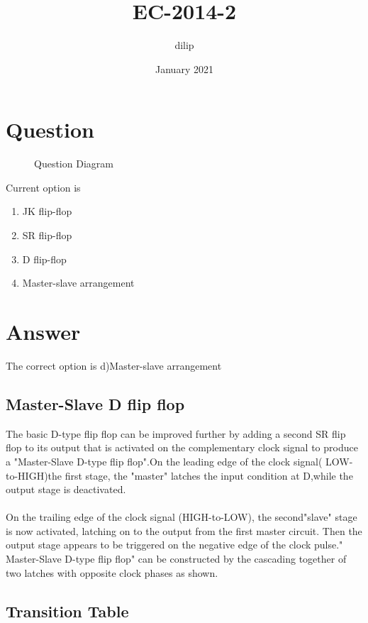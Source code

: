 \documentclass{article}
\title{EC-2014-2}
\author{dilip}
\date{January 2021}
\begin{document}
\maketitle

\section{Question}

\begin{figure}[h]
    \centering
    \scalebox{0.65}{
    }
    \caption{Question Diagram}
    \label{fig:my_label}
\end{figure}

Current option is

\begin{enumerate}[label=(\alph*)]
    \item JK flip-flop
    \item SR flip-flop
    \item D flip-flop
    \item Master-slave arrangement
\end{enumerate}

\section{Answer} 
 The correct option is d)Master-slave arrangement
 \subsection{Master-Slave D flip flop}
  The basic D-type flip flop can be improved further by adding a second SR flip flop to its output that is activated on the complementary clock signal to produce a "Master-Slave D-type flip flop".On the leading edge of the clock signal( LOW-to-HIGH)the first stage, the "master" latches the input condition at D,while the output stage is deactivated.
  \paragraph{}
  On the trailing edge of the clock signal (HIGH-to-LOW), the second"slave" stage is now activated, latching on to the output from the first master circuit. Then the output stage appears to be triggered on the negative edge of the clock pulse." Master-Slave D-type flip flop" can be constructed by the cascading together of two latches with opposite clock phases as shown.
  
\subsection{Transition Table}
\begin{table}[h]
\centering


\label{tab:my-table}
\end{table}
\end{document}
